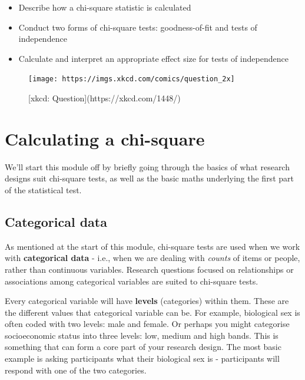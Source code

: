 \documentclass[
]{book}
\providecommand{\tightlist}{%
  \setlength{\itemsep}{0pt}\setlength{\parskip}{0pt}}
\begin{document}
\begin{itemize}
\tightlist
\item
  Describe how a chi-square statistic is calculated
\item
  Conduct two forms of chi-square tests: goodness-of-fit and tests of independence
\item
  Calculate and interpret an appropriate effect size for tests of independence
\end{itemize}

\begin{figure}

{\centering \texttt{[image: https://imgs.xkcd.com/comics/question\_2x]} 

}

\caption{[xkcd: Question](https://xkcd.com/1448/)}\label{fig:unnamed-chunk-93}
\end{figure}

\hypertarget{calculating-a-chi-square}{%
\section{Calculating a chi-square}\label{calculating-a-chi-square}}

We'll start this module off by briefly going through the basics of what research designs suit chi-square tests, as well as the basic maths underlying the first part of the statistical test.

\hypertarget{categorical-data}{%
\subsection{Categorical data}\label{categorical-data}}

As mentioned at the start of this module, chi-square tests are used when we work with \textbf{categorical data} - i.e., when we are dealing with \emph{counts} of items or people, rather than continuous variables. Research questions focused on relationships or associations among categorical variables are suited to chi-square tests.

Every categorical variable will have \textbf{levels} (categories) within them. These are the different values that categorical variable can be. For example, biological sex is often coded with two levels: male and female. Or perhaps you might categorise socioeconomic status into three levels: low, medium and high bands. This is something that can form a core part of your research design. The most basic example is asking participants what their biological sex is - participants will respond with one of the two categories.
\end{document}
